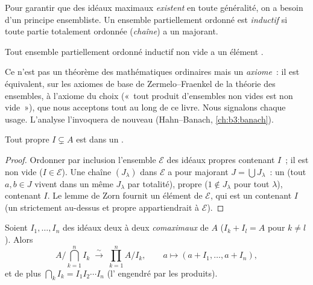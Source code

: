 Pour garantir que des idéaux maximaux \emph{existent} en toute
généralité, on a besoin d'un principe ensembliste. Un ensemble
partiellement ordonné est \emph{inductif} si toute partie
totalement ordonnée (\emph{chaîne}) a un majorant.

\begin{theorem}\label{thm:b3:rings:zorn}
Tout ensemble partiellement ordonné inductif non vide a un
élément .
\admitted
\end{theorem}

\begin{remark}\label{rem:b3:rings:zorn}
Ce n'est pas un théorème des mathématiques ordinaires mais un
\emph{axiome}~: il est équivalent, sur les axiomes de base de
Zermelo--Fraenkel de la théorie des ensembles, à l'axiome du
choix («~tout produit d'ensembles non vides est non vide~»), que
nous acceptons tout au long de ce livre. Nous signalons chaque
usage. L'analyse l'invoquera de nouveau (Hahn--Banach,
\cref{ch:b3:banach}).
\end{remark}

\begin{theorem}[Krull]\label{thm:b3:rings:krull}
Tout  propre $I \subsetneq A$ est  dans un .
\end{theorem}

\begin{proof}
Ordonner par inclusion l'ensemble $\mathcal E$ des idéaux
propres contenant $I$~; il est non vide ($I \in \mathcal E$).
Une chaîne $(J_\lambda)$ dans $\mathcal E$ a pour majorant $J =
\bigcup J_\lambda$~: un  (tout $a, b \in J$ vivent dans un
même $J_\lambda$ par totalité), propre ($1 \notin J_\lambda$
pour tout $\lambda$), contenant $I$. Le lemme de Zorn fournit un
élément  de $\mathcal E$, qui est un 
contenant $I$ (un  strictement au-dessus et propre
appartiendrait à $\mathcal E$).
\end{proof}

\begin{theorem}\label{thm:b3:rings:crt}
Soient $I_1, \dots, I_n$ des idéaux deux à deux
\emph{comaximaux} de $A$ ($I_k + I_l =
A$ pour $k \neq l$). Alors
\[
A\Big/\bigcap_{k=1}^n I_k \;\xrightarrow{\;\sim\;}\;
\prod_{k=1}^n A/I_k,
\qquad
a \longmapsto (a + I_1, \dots, a + I_n),
\]
et de plus $\bigcap_k I_k = I_1 I_2 \cdots I_n$ (l'
engendré par les produits).
\end{theorem}

